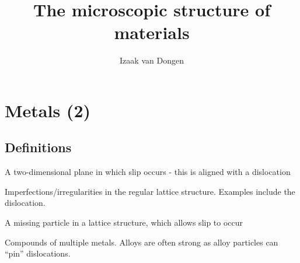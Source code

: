 \documentclass{article}
\title{The microscopic structure of materials}
\author{Izaak van Dongen}
\begin{document}
    \section{Metals (2)}
    \subsection{Definitions}
    \begin{mdframed}[backgroundcolor = gray!30,
        frametitle = Slip plane]
        A two-dimensional plane in which slip occurs - this is aligned with a
        dislocation
    \end{mdframed}
    \begin{mdframed}[backgroundcolor = gray!30,
        frametitle = Lattice defects]
        Imperfections/irregularities in the regular lattice structure. Examples
        include the dislocation.
    \end{mdframed}
    \begin{mdframed}[backgroundcolor = gray!30,
        frametitle = Dislocations]
        A missing particle in a lattice structure, which allows slip to occur
    \end{mdframed}
    \begin{mdframed}[backgroundcolor = gray!30,
        frametitle = Alloys]
        Compounds of multiple metals. Alloys are often strong as alloy
        particles can ``pin'' dislocations.
    \end{mdframed}
\end{document}
